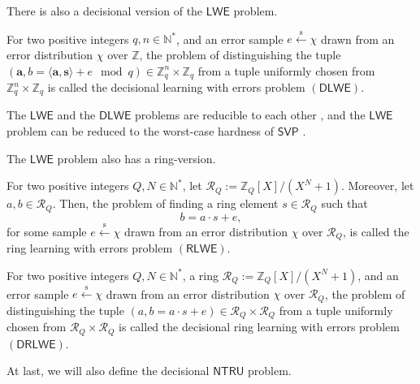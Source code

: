 There is also a decisional version of the $\mathsf{LWE}$ problem.
\begin{definition}\label{def:dlwe_prob}
For two positive integers $q,n \in \mathbb{N}^*$, and an error sample $e \xleftarrow{\text{s}} \chi$ drawn from an error distribution $\chi$ over $\mathbb{Z}$, the problem of distinguishing the tuple $(\mathbf{a}, b = \langle \mathbf{a}, \mathbf{s} \rangle + e \mod q) \in \mathbb{Z}_q^n \times \mathbb{Z}_q$ from a tuple uniformly chosen from $\mathbb{Z}_q^n \times \mathbb{Z}_q$ is called the decisional learning with errors problem $(\mathsf{DLWE})$.
\end{definition}

The $\mathsf{LWE}$ and the $\mathsf{DLWE}$ problems are reducible to each other \cite{cite:tfhe}, and the $\mathsf{LWE}$ problem can be reduced to the worst-case hardness of $\mathsf{SVP}$ \cite{cite:bv_lwe}.

The $\mathsf{LWE}$ problem also has a ring-version.

\begin{definition}\label{def:rlwe_prob}
For two positive integers $Q,N \in \mathbb{N}^*$, let $\mathcal{R}_Q := \mathbb{Z}_Q[X] / (X^N + 1)$. Moreover, let $a, b \in \mathcal{R}_Q$. Then, the problem of finding a ring element $s  \in \mathcal{R}_Q$ such that
$$b = a \cdot s + e,$$
for some sample $e \xleftarrow{\text{s}} \chi$ drawn from an error distribution $\chi$ over $\mathcal{R}_Q$, is called the ring learning with errors problem $(\mathsf{RLWE})$.
\end{definition}

\begin{definition}\label{def:drlwe_prob}
For two positive integers $Q,N \in \mathbb{N}^*$, a ring $\mathcal{R}_Q := \mathbb{Z}_Q[X] / (X^N + 1)$, and an error sample $e \xleftarrow{\text{s}} \chi$ drawn from an error distribution $\chi$ over $\mathcal{R}_Q$, the problem of distinguishing the tuple $(a, b = a \cdot s + e) \in \mathcal{R}_Q \times \mathcal{R}_Q$ from a tuple uniformly chosen from $\mathcal{R}_Q \times \mathcal{R}_Q$ is called the decisional ring learning with errors problem $(\mathsf{DRLWE})$.
\end{definition}

At last, we will also define the decisional $\mathsf{NTRU}$ problem.

